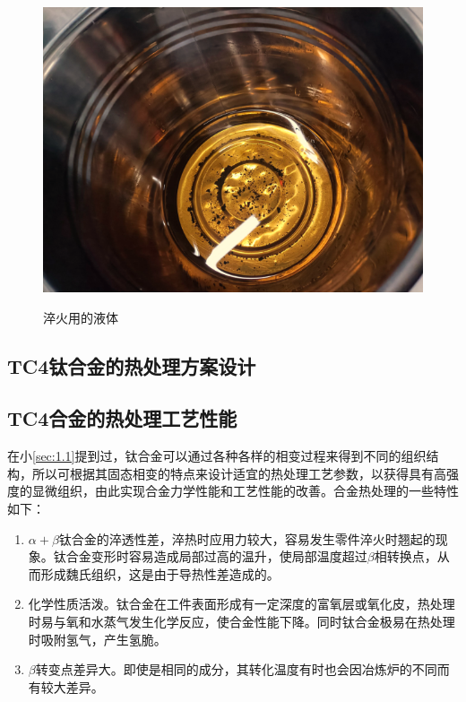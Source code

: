 \begin{figure}[h!]
{		\includegraphics[scale=0.4]{pic/淬火油}}
	\caption{淬火用的液体}
	\label{fig:淬火用液体}
\end{figure}

\subsection{TC4钛合金的热处理方案设计}
\subsection{TC4合金的热处理工艺性能}
在小\ref{sec:1.1}提到过，钛合金可以通过各种各样的相变过程来得到不同的组织结构，所以可根据其固态相变的特点来设计适宜的热处理工艺参数，以获得具有高强度的显微组织，由此实现\ti 合金力学性能和工艺性能的改善。\ti 合金热处理的一些特性如下：
\begin{enumerate}
	\item $\alpha+\beta$钛合金的淬透性差，淬热时应用力较大，容易发生零件淬火时翘起的现象。钛合金变形时容易造成局部过高的温升，使局部温度超过$\beta$相转换点，从而形成魏氏组织，这是由于导热性差造成的。
	\item 化学性质活泼。钛合金在工件表面形成有一定深度的富氧层或氧化皮，热处理时易与氧和水蒸气发生化学反应，使合金性能下降。同时钛合金极易在热处理时吸附氢气，产生氢脆。
	\item $\beta$转变点差异大。即使是相同的成分，其转化温度有时也会因冶炼炉的不同而有较大差异。
\end{enumerate}
